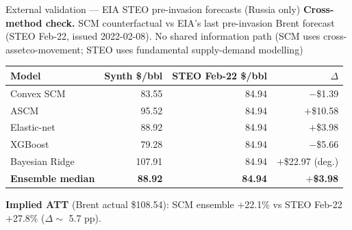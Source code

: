 \documentclass[aspectratio=169,11pt]{beamer}
\newcommand{\smalltext}[1]{{\footnotesize\textcolor{muted}{#1}}}
\newcommand{\hd}[1]{\textbf{#1}}
\begin{document}
\begin{frame}{External validation --- EIA STEO pre-invasion forecasts (Russia only)}
  \hd{Cross-method check.} SCM counterfactual vs EIA's last pre-invasion Brent forecast (STEO Feb-22, issued 2022-02-08). No shared information path (SCM uses cross-assetco-movement; STEO uses fundamental supply-demand modelling)

  \vspace{0.6em}
  \footnotesize
  \begin{tabular}{@{}l r r r@{}}
    \toprule
    \hd{Model}     & \hd{Synth \$/bbl} & \hd{STEO Feb-22 \$/bbl} & \hd{$\Delta$} \\
    \midrule
    Convex SCM     & 83.55             & 84.94                   & $-$\$1.39  \\
    ASCM           & 95.52             & 84.94                   & $+$\$10.58 \\
    Elastic-net    & 88.92             & 84.94                   & $+$\$3.98  \\
    XGBoost        & 79.28             & 84.94                   & $-$\$5.66  \\
    Bayesian Ridge & 107.91            & 84.94                   & $+$\$22.97 (deg.) \\
    \midrule
    \hd{Ensemble median} & \hd{88.92}  & \hd{84.94}              & \hd{$+$\$3.98} \\
    \bottomrule
  \end{tabular}
  \normalsize

  \vspace{0.6em}
  \hd{Implied ATT} \smalltext{(Brent actual \$108.54)}: SCM ensemble $+$22.1\% \quad vs \quad STEO Feb-22 $+$27.8\% \quad ($\Delta \sim$ 5.7 pp).

  \vspace{0.3em}
\end{frame}
\end{document}
